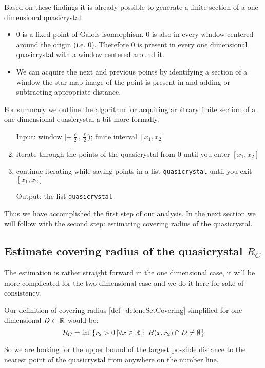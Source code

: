 \documentclass[text.tex]{subfiles}
\begin{document}
Based on these findings it is already possible to generate a finite section of a one dimensional quasicrystal. 
\begin{itemize}
\item $0$ is a fixed point of Galois isomorphism. $0$ is also in every window centered around the origin (i.e. $0$). Therefore $0$ is present in every one dimensional quasicrystal with a window centered around it. 
\item We can acquire the next and previous points by identifying a section of a window the star map image of the point is present in and adding or subtracting appropriate distance. 
\end{itemize}

For summary we outline the algorithm for acquiring arbitrary finite section of a one dimensional quasicrystal a bit more formally. 

\begin{enumerate}
\item[Input:] window $[-\frac{\ell}{2},\frac{\ell}{2})$; finite interval $[x_1,x_2]$
\item iterate through the points of the quasicrystal from $0$ until you enter $[x_1,x_2]$
\item continue iterating while saving points in a list \texttt{quasicrystal} until you exit $[x_1,x_2]$
\item[Output:] the list \texttt{quasicrystal}
\end{enumerate}

Thus we have accomplished the first step of our analysis. In the next section we will follow with the second step: estimating covering radius of the quasicrystal. 

\subsection{Estimate covering radius of the quasicrystal $R_C$}
The estimation is rather straight forward in the one dimensional case, it will be more complicated for the two dimensional case and we do it here for sake of consistency. 

Our definition of covering radius \ref{def_deloneSetCovering} simplified for one dimensional $D\subset\mathbb{R}$ would be: 
$$R_C = \inf\left\{ r_2>0\left| \forall x\in\mathbb{R}:\; B(x,r_2)\cap D \neq \emptyset \right. \right\}$$

So we are looking for the upper bound of the largest possible distance to the nearest point of the quasicrystal from anywhere on the number line. 
\end{document}
